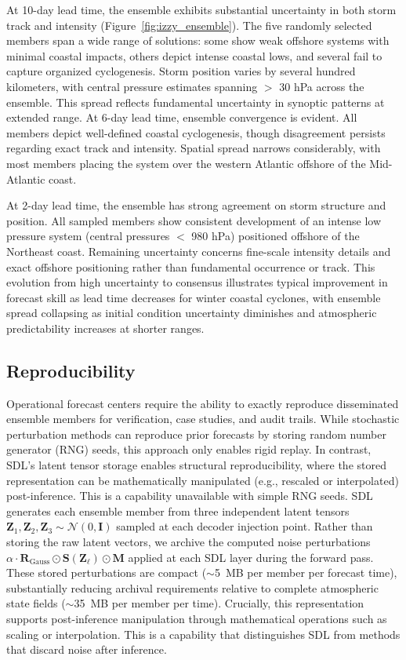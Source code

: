\documentclass[11pt]{article}
\begin{document}
At 10-day lead time, the ensemble exhibits substantial uncertainty in both storm track and intensity (Figure~\ref{fig:izzy_ensemble}). The five randomly selected members span a wide range of solutions: some show weak offshore systems with minimal coastal impacts, others depict intense coastal lows, and several fail to capture organized cyclogenesis. Storm position varies by several hundred kilometers, with central pressure estimates spanning $>$ 30 hPa across the ensemble. This spread reflects fundamental uncertainty in synoptic patterns at extended range. At 6-day lead time, ensemble convergence is evident. All members depict well-defined coastal cyclogenesis, though disagreement persists regarding exact track and intensity. Spatial spread narrows considerably, with most members placing the system over the western Atlantic offshore of the Mid-Atlantic coast.

At 2-day lead time, the ensemble has strong agreement on storm structure and position. All sampled members show consistent development of an intense low pressure system (central pressures $<$ 980 hPa) positioned offshore of the Northeast coast. Remaining uncertainty concerns fine-scale intensity details and exact offshore positioning rather than fundamental occurrence or track. This evolution from high uncertainty to consensus illustrates typical improvement in forecast skill as lead time decreases for winter coastal cyclones, with ensemble spread collapsing as initial condition uncertainty diminishes and atmospheric predictability increases at shorter ranges.

\subsection{Reproducibility}

Operational forecast centers require the ability to exactly reproduce disseminated
ensemble members for verification, case studies, and audit trails. While stochastic perturbation methods can reproduce prior forecasts by storing random number generator (RNG) seeds, this approach only enables rigid replay. In contrast, SDL's latent tensor storage enables structural reproducibility, where the stored representation can be mathematically manipulated (e.g., rescaled or interpolated) post-inference. This is a capability unavailable with simple RNG seeds. SDL generates each ensemble member from three independent latent tensors $\mathbf{Z}_1, \mathbf{Z}_2, \mathbf{Z}_3 \sim \mathcal{N}(0, \mathbf{I})$ sampled at each decoder injection point. Rather than storing the raw latent vectors, we archive the computed noise perturbations $\alpha \cdot \mathbf{R}_{\text{Gauss}} \odot \mathbf{S}(\mathbf{Z}_\ell) \odot \mathbf{M}$ applied at each SDL layer during the forward pass. These stored perturbations are compact ($\sim$5~MB per member per forecast time), substantially reducing archival requirements relative to complete atmospheric state fields ($\sim$35~MB per member per time). Crucially, this representation supports post-inference manipulation through mathematical operations such as scaling or interpolation. This is a capability that distinguishes SDL from methods that discard noise after inference. 
\end{document}
